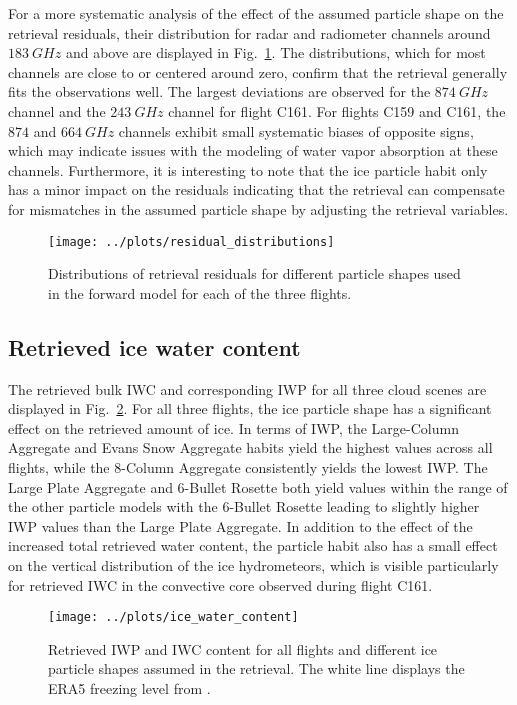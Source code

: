 \documentclass[journal abbreviation, manuscript]{copernicus}
\begin{document}
For a more systematic analysis of the effect of the assumed particle shape on
the retrieval residuals, their distribution for radar and radiometer channels
around $183\ \unit{GHz}$ and above are displayed in
Fig.~\ref{fig:residuals_box}. The distributions, which for most channels are
close to or centered around zero, confirm that the retrieval generally fits the
observations well. The largest deviations are observed for the $874\ \unit{GHz}$
channel and the $243\ \unit{GHz}$ channel for flight C161. For flights C159 and
C161, the $874$ and $664\ \unit{GHz}$ channels exhibit small systematic biases
of opposite signs, which may indicate issues with the modeling of water vapor
absorption at these channels. Furthermore, it is interesting to note that the
ice particle habit only has a minor impact on the residuals indicating that the
retrieval can compensate for mismatches in the assumed particle shape by
adjusting the retrieval variables.


\begin{figure}[!hbpt]
  \centering
  \texttt{[image: ../plots/residual\_distributions]}
  \caption{Distributions of retrieval residuals for different particle
    shapes used in the forward model for each of the three flights.}
  \label{fig:residuals_box}
\end{figure}

\subsection{Retrieved ice water content}

The retrieved bulk IWC and corresponding IWP for all three cloud scenes are
displayed in Fig.~\ref{fig:ice_water_content}. For all three flights, the ice
particle shape has a significant effect on the retrieved amount of ice. In terms
of IWP, the Large-Column Aggregate and Evans Snow Aggregate habits yield the
highest values across all flights, while the 8-Column Aggregate consistently
yields the lowest IWP. The Large Plate Aggregate and 6-Bullet Rosette both yield
values within the range of the other particle models with the 6-Bullet Rosette
leading to slightly higher IWP values than the Large Plate Aggregate. In
addition to the effect of the increased total retrieved water content, the
particle habit also has a small effect on the vertical distribution of the ice
hydrometeors, which is visible particularly for retrieved IWC in the convective
core observed during flight C161.


\begin{figure}[!hbpt]
  \centering
  \texttt{[image: ../plots/ice\_water\_content]}
  \caption{Retrieved IWP and IWC content for all flights and different ice
    particle shapes assumed in the retrieval. The white line displays the ERA5
    freezing level from \citet{era5}.
  }
  \label{fig:ice_water_content}
\end{figure}
\end{document}
